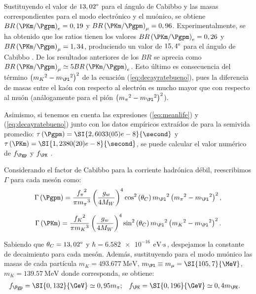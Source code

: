Sustituyendo el valor de $13,02\degree$ para el ángulo de Cabibbo y las masas correspondientes para el modo electrónico y el muónico, se obtiene $BR\left(\PKm / \Pgpm\right)_{e}=0,19$ y $BR\left(\PKm / \Pgpm\right)_{\mu}=0,96$. Experimentalmente, se ha obtenido que los ratios tienen los valores $BR\left(\PKm / \Pgpm\right)_{e}=0,26$ y $BR\left(\PKm / \Pgpm\right)_{\mu}=1,34$, produciendo un valor de  $15,4\degree$ para el ángulo de Cabibbo \cite{Griffiths2008}. De los resultados anteriores de los $BR$ se aprecia como $BR\left(\PKm / \Pgpm\right)_{{\mu}} \simeq 5 BR\left(\PKm / \Pgpm\right)_{e}$. Esto último es consecuencia del término $\left({m_{K}}^{2}-{m_{\Pl}}^{2}\right)^{2}$ de la ecuación (\ref{eq:decayratebueno}), pues la diferencia de masas entre el kaón con respecto al electrón es mucho mayor que con respecto al muón (análogamente para el pión $\left({m_{\pi}}^{2}-{m_{\Pl}}^{2}\right)^{2}$). 

Asimismo, si tenemos en cuenta las expresiones (\ref{eq:meanlife}) y (\ref{eq:decayratebueno}) junto con los datos empíricos extraídos de \cite{Zyla} para la semivida promedio: $\tau \left(\Pgpm\right)=\SI{2,6033(05)e-8}{\second}$ y $\tau \left(\PKm\right)=\SI{1,2380(20)e-8}{\second}$, se puede calcular el valor numérico de $f_{\Pgp}$ y $f_{\PK}$ \cite{Renton}. 

Considerando el factor de Cabibbo para la corriente hadrónica débil, reescribimos $\Gamma$ para cada mesón como:
\begin{equation}
\Gamma\left(\Pgpm \right) =\dfrac{{f_{\pi}}^{2}}{\pi {m_{\pi}}^{3}}\left( \dfrac{g_w}{4M_W}\right)^{4} \cos^{2} \left(\theta_{C}\right)  {m_{\Pl}}^{2}\left({m_{\pi}}^{2}-{m_{\Pl}}^{2}\right)^{2} ,\label{eq:decayPIcab}
\end{equation}

\begin{equation}
\Gamma\left(\PKm \right) =\dfrac{{f_{K}}^{2}}{\pi {m_{K}}^{3}}\left(\dfrac{g_w}{4M_W}\right)^{4} \sin^{2} \left(\theta_{C}\right) {m_{\Pl}}^{2}\left({m_{K}}^{2}-{m_{\Pl}}^{2}\right)^{2} .\label{eq:decayKcab}
\end{equation}


Sabiendo que $\theta_{C}=13,02\degree$ y $\hbar=\SI{6,582e-16}{\eV\cdot\second}$, despejamos la constante de decaimiento para cada mesón. Además, sustituyendo para el modo muónico las masas de cada partícula $m_{K}=\SI{493,677}{\MeV}$, $m_{\Pl} \equiv m_{\mu}=\SI{105,7}{\MeV}$, $m_{K}=\SI{139,57}{\MeV}$ donde corresponda, se obtiene:
\begin{align}
f_{\Pgp} &= \SI{0,132}{\GeV} \simeq 0,95m_{\pi} ; & f_{\PK} &= \SI{0,196}{\GeV} \simeq 0,4m_{\PK} .
\end{align}


